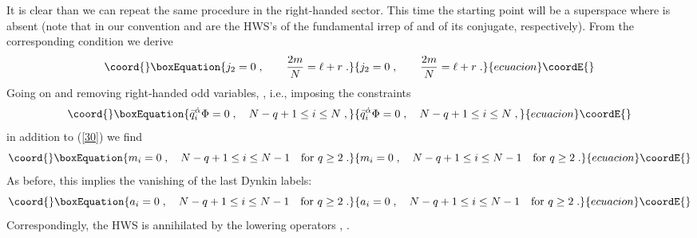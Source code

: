 \documentclass[a4paper,12pt]{article}
\begin{document}
It is clear than we can repeat the same procedure in the 
right-handed sector. This time the starting point will be a 
superspace where \coordHE{} is absent (note that 
in our convention \coordHE{} and \coordHE{} are the HWS's of the 
fundamental irrep of \coordHE{} and of its conjugate, 
respectively). From the corresponding condition \coordHE{} we derive 
\begin{equation}\coord{}\boxEquation{\label{30}
  j_2=0\;, \qquad {2m\over N}=\ell+r\;.
}{j_2=0\;, \qquad {2m\over N}=\ell+r\;.
}{ecuacion}\coordE{}\end{equation}
Going on and removing \coordHE{} right-handed odd variables, 
\coordHE{}, 
i.e., imposing the constraints 
\begin{equation}\coord{}\boxEquation{\label{30'}
  \bar 
q_i^{\dot\alpha}\Phi=0\;, \quad  N-q+1\leq i \leq N \;,
}{\bar 
q_i^{\dot\alpha}\Phi=0\;, \quad  N-q+1\leq i \leq N \;,
}{ecuacion}\coordE{}\end{equation}
in addition to (\ref{30}) we find 
\begin{equation}\coord{}\boxEquation{\label{31}
  m_i=0\;, \quad  N-q+1\leq i \leq N-1   \quad \mbox{for}\ q\geq2\;.
}{m_i=0\;, \quad  N-q+1\leq i \leq N-1   \quad \mbox{for}\ q\geq2\;.
}{ecuacion}\coordE{}\end{equation}
As before, this implies the vanishing of the last \coordHE{} Dynkin 
labels:
\begin{equation}\coord{}\boxEquation{\label{32}
  a_i=0\;, \quad  N-q+1\leq i \leq N-1  \quad \mbox{for}\ q\geq2\;.
}{a_i=0\;, \quad  N-q+1\leq i \leq N-1  \quad \mbox{for}\ q\geq2\;.
}{ecuacion}\coordE{}\end{equation}
Correspondingly, the HWS is annihilated by the lowering operators 
\coordHE{}, \coordHE{}. 
\end{document}
